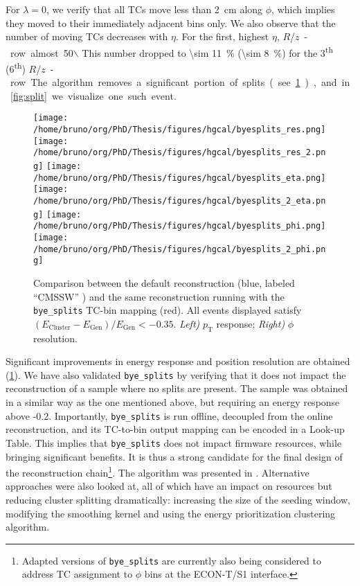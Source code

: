 \documentclass[11pt]{article}
\newcommand{\pt}{p_{\text{T}}}
\newcommand{\azimuth}{$\phi$}
\newcommand{\bsplits}{\texttt{bye\_splits}}
\newcommand{\rapidity}{$\eta$}
\newcommand{\rz}{$R$/$z$}
\begin{document}
For \(\lambda=0\), we verify that all \acp{TC} move less than \SI{2}{\cm} along \azimuth{}, which implies they moved to their immediately adjacent bins only.
We also observe that the number of moving \acp{TC} decreases with \rapidity{}.
For the first, highest \rapidity{}, \si{\rz}-row almost 50$\backslash$%
This number dropped to \SI{\sim 11}{\percent} (\SI{\sim 8}{\percent}) for the 3\textsuperscript{th} (6\textsuperscript{th}) \si{\rz}-row.
The algorithm removes a significant portion of splits (see \cref{fig:byesplits_res}), and in \cref{fig:split} we visualize one such event.

\begin{figure}
\texttt{[image: /home/bruno/org/PhD/Thesis/figures/hgcal/byesplits\_res.png]}
\texttt{[image: /home/bruno/org/PhD/Thesis/figures/hgcal/byesplits\_res\_2.png]}
\texttt{[image: /home/bruno/org/PhD/Thesis/figures/hgcal/byesplits\_eta.png]}
\texttt{[image: /home/bruno/org/PhD/Thesis/figures/hgcal/byesplits\_2\_eta.png]}
\texttt{[image: /home/bruno/org/PhD/Thesis/figures/hgcal/byesplits\_phi.png]}
\texttt{[image: /home/bruno/org/PhD/Thesis/figures/hgcal/byesplits\_2\_phi.png]}
\caption{\label{fig:byesplits_res}Comparison between the default reconstruction (blue, labeled ``CMSSW'' \cite{cmssw}) and the same reconstruction running with the \bsplits{} TC-bin mapping (red). All events displayed satisfy \((E_{\text{Cluster}}-E_{\text{Gen}})/E_{\text{Gen}} < -0.35\). \emph{Left)} \(\pt\) response; \emph{Right)} \(\phi\) resolution.}
\end{figure}

Significant improvements in energy response and position resolution are obtained (\cref{fig:byesplits_res}).
We have also validated \bsplits{} by verifying that it does not impact the reconstruction of a sample where no splits are present.
The sample was obtained in a similar way as the one mentioned above, but requiring an energy response above -0.2.
Importantly, \bsplits{} is run offline, decoupled from the online reconstruction, and its \ac{TC}-to-bin output mapping can be encoded in a Look-up Table.
This implies that \bsplits{} does not impact firmware resources, while bringing significant benefits.
It is thus a strong candidate for the final design of the reconstruction chain\footnote{Adapted versions of \bsplits{} are currently also being considered to address \ac{TC} assignment to \azimuth{} bins at the \ac{ECON-T}/\ac{S1} interface.}. 
The algorithm was presented in \cite{bruno_chep23}.
Alternative approaches were also looked at, all of which have an impact on resources but reducing cluster splitting dramatically: increasing the size of the seeding window, modifying the smoothing kernel and using the energy prioritization clustering algorithm.
\end{document}
